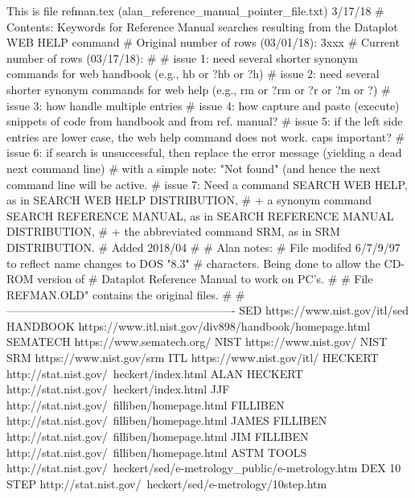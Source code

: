 This is file refman.tex   (alan_reference_manual_pointer_file.txt)   3/17/18
# Contents: Keywords for Reference Manual searches resulting from the Dataplot     WEB HELP     command
# Original number of rows (03/01/18): 3xxx
# Current  number of rows (03/17/18):
#
# issue 1: need several shorter synonym commands for    web handbook (e.g., hb or ?hb or ?h)
# issue 2: need several shorter synonym commands for    web help     (e.g., rm or ?rm or ?r or ?m or ?)
# issue 3: how handle multiple entries
# issue 4: how capture and paste (execute) snippets of code from handbook and from ref. manual?
# issue 5: if the left side entries are lower case, the web help command does not work.  caps important?
# issue 6: if search is unsuccessful, then replace the error message (yielding a dead next command line)
#          with a simple note: "Not found" (and hence the next command line will be active.
# issue 7: Need a command             SEARCH WEB HELP,         as in SEARCH WEB HELP DISTRIBUTION,
#          + a synonym command        SEARCH REFERENCE MANUAL, as in SEARCH REFERENCE MANUAL DISTRIBUTION,
#          + the abbreviated command  SRM,                     as in SRM DISTRIBUTION.
#          Added 2018/04
#
# Alan notes:
#    File modifed 6/7/9/97 to reflect name changes to DOS "8.3"
#    characters.  Being done to allow the CD-ROM version of
#    Dataplot Reference Manual to work on PC's.
#
#    File REFMAN.OLD" contains the original files.
#
# -------------------------------------------------------------
SED                                     https://www.nist.gov/itl/sed
HANDBOOK                                https://www.itl.nist.gov/div898/handbook/homepage.html
SEMATECH                                https://www.sematech.org/
NIST                                    https://www.nist.gov/
NIST SRM                                https://www.nist.gov/srm
ITL                                     https://www.nist.gov/itl/
HECKERT                                 http://stat.nist.gov/~heckert/index.html
ALAN HECKERT                            http://stat.nist.gov/~heckert/index.html
JJF                                     http://stat.nist.gov/~filliben/homepage.html
FILLIBEN                                http://stat.nist.gov/~filliben/homepage.html
JAMES FILLIBEN                          http://stat.nist.gov/~filliben/homepage.html
JIM FILLIBEN                            http://stat.nist.gov/~filliben/homepage.html
ASTM TOOLS                              http://stat.nist.gov/~heckert/sed/e-metrology_public/e-metrology.htm
DEX 10 STEP                             http://stat.nist.gov/~heckert/sed/e-metrology/10step.htm
